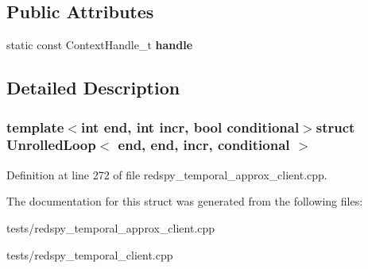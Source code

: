 \subsection*{Public Attributes}
\begin{DoxyCompactItemize}
\item 
\hypertarget{structUnrolledLoop_3_01end_00_01end_00_01incr_00_01conditional_01_4_a68f1e854145341f09dfc4cf568cc69fe}{static const Context\-Handle\-\_\-t {\bfseries handle}}\label{structUnrolledLoop_3_01end_00_01end_00_01incr_00_01conditional_01_4_a68f1e854145341f09dfc4cf568cc69fe}

\end{DoxyCompactItemize}


\subsection{Detailed Description}
\subsubsection*{template$<$int end, int incr, bool conditional$>$struct Unrolled\-Loop$<$ end, end, incr, conditional $>$}



Definition at line 272 of file redspy\-\_\-temporal\-\_\-approx\-\_\-client.\-cpp.



The documentation for this struct was generated from the following files\-:\begin{DoxyCompactItemize}
\item 
tests/redspy\-\_\-temporal\-\_\-approx\-\_\-client.\-cpp\item 
tests/redspy\-\_\-temporal\-\_\-client.\-cpp\end{DoxyCompactItemize}
